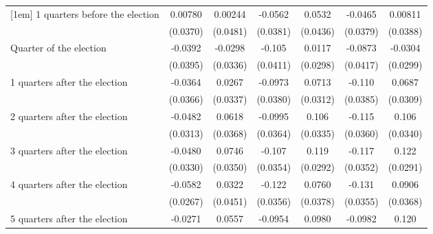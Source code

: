 \begin{table}[htbp]
\begin{tabular}{l*{6}{c}}
[1em]
 1 quarters before the election&     0.00780         &     0.00244         &     -0.0562         &      0.0532         &     -0.0465         &     0.00811         \\
                    &    (0.0370)         &    (0.0481)         &    (0.0381)         &    (0.0436)         &    (0.0379)         &    (0.0388)         \\
[1em]
Quarter of the election&     -0.0392         &     -0.0298         &      -0.105\sym{*}  &      0.0117         &     -0.0873\sym{*}  &     -0.0304         \\
                    &    (0.0395)         &    (0.0336)         &    (0.0411)         &    (0.0298)         &    (0.0417)         &    (0.0299)         \\
[1em]
 1 quarters after the election&     -0.0364         &      0.0267         &     -0.0973\sym{*}  &      0.0713\sym{*}  &      -0.110\sym{**} &      0.0687\sym{*}  \\
                    &    (0.0366)         &    (0.0337)         &    (0.0380)         &    (0.0312)         &    (0.0385)         &    (0.0309)         \\
[1em]
 2 quarters after the election&     -0.0482         &      0.0618         &     -0.0995\sym{**} &       0.106\sym{**} &      -0.115\sym{**} &       0.106\sym{**} \\
                    &    (0.0313)         &    (0.0368)         &    (0.0364)         &    (0.0335)         &    (0.0360)         &    (0.0340)         \\
[1em]
 3 quarters after the election&     -0.0480         &      0.0746\sym{*}  &      -0.107\sym{**} &       0.119\sym{***}&      -0.117\sym{***}&       0.122\sym{***}\\
                    &    (0.0330)         &    (0.0350)         &    (0.0354)         &    (0.0292)         &    (0.0352)         &    (0.0291)         \\
[1em]
 4 quarters after the election&     -0.0582\sym{*}  &      0.0322         &      -0.122\sym{***}&      0.0760\sym{*}  &      -0.131\sym{***}&      0.0906\sym{*}  \\
                    &    (0.0267)         &    (0.0451)         &    (0.0356)         &    (0.0378)         &    (0.0355)         &    (0.0368)         \\
[1em]
 5 quarters after the election&     -0.0271         &      0.0557         &     -0.0954\sym{**} &      0.0980\sym{**} &     -0.0982\sym{**} &       0.120\sym{***}\\

\end{tabular}
\end{table}
